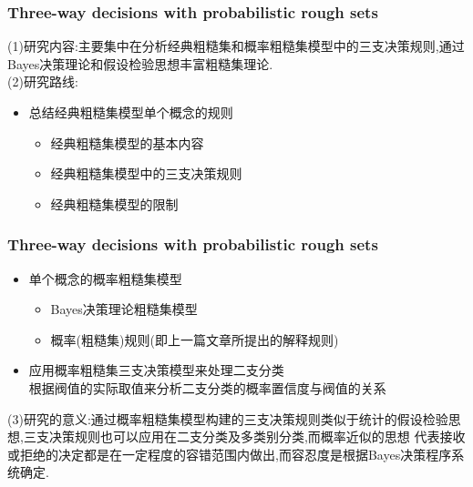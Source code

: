\documentclass[aspectratio=169]{beamer}
\begin{document}
\begin{frame}
  \frametitle{Three-way decisions with probabilistic rough sets}
  \vspace{0.3cm}
  (1)研究内容:主要集中在分析经典粗糙集和概率粗糙集模型中的三支决策规则,通过Bayes决策理论和假设检验思想丰富粗糙集理论.\\
  \vspace{0.2cm}
  (2)研究路线:\\
  \begin{itemize}
    \item 总结经典粗糙集模型单个概念的规则
    \begin{itemize}
      \item 经典粗糙集模型的基本内容
      \item 经典粗糙集模型中的三支决策规则
      \item 经典粗糙集模型的限制
    \end{itemize}
  \end{itemize}
\end{frame}

\begin{frame}
  \frametitle{Three-way decisions with probabilistic rough sets}
  \vspace{0.3cm}
  
  \begin{itemize}
    \item 单个概念的概率粗糙集模型
    \begin{itemize}
      \item Bayes决策理论粗糙集模型
      \item 概率(粗糙集)规则(即上一篇文章所提出的解释规则)
    \end{itemize}
    \item 应用概率粗糙集三支决策模型来处理二支分类\\
    \vspace{0.2cm}
    根据阀值的实际取值来分析二支分类的概率置信度与阀值的关系
  \end{itemize}
  \vspace{0.1cm}
  (3)研究的意义:通过概率粗糙集模型构建的三支决策规则类似于统计的假设检验思想,三支决策规则也可以应用在二支分类及多类别分类,而概率近似的思想
  代表接收或拒绝的决定都是在一定程度的容错范围内做出,而容忍度是根据Bayes决策程序系统确定.
\end{frame}
\end{document}

